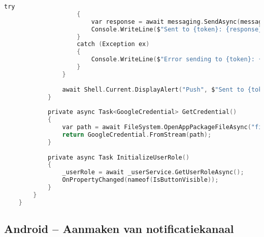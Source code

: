 \begin{lstlisting}[language=C, caption=Versturen van pushnotificaties in HomePageViewModel, label=lst:pushnotification-viewmodel]
                    try
                    {
                        var response = await messaging.SendAsync(message);
                        Console.WriteLine($"Sent to {token}: {response}");
                    }
                    catch (Exception ex)
                    {
                        Console.WriteLine($"Error sending to {token}: {ex.Message}");
                    }
                }
                
                await Shell.Current.DisplayAlert("Push", $"Sent to {tokens.Count} device(s)", "OK");
            }
            
            private async Task<GoogleCredential> GetCredential()
            {
                var path = await FileSystem.OpenAppPackageFileAsync("firebase-adminsdk.json");
                return GoogleCredential.FromStream(path);
            }
            
            private async Task InitializeUserRole()
            {
                _userRole = await _userService.GetUserRoleAsync();
                OnPropertyChanged(nameof(IsButtonVisible));
            }
        }
    }
\end{lstlisting}

\subsection{Android – Aanmaken van notificatiekanaal}

